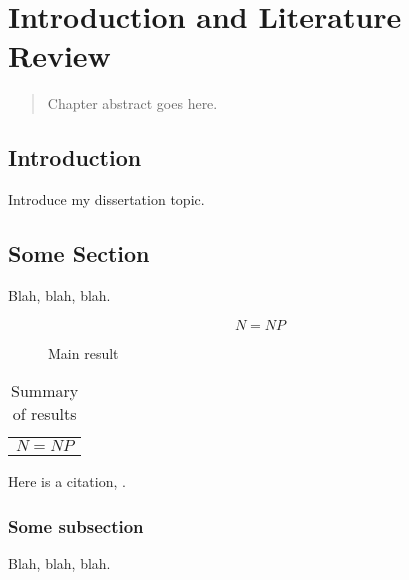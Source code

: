 \chapter{Introduction and Literature Review}

\begin{quote}
Chapter abstract goes here.
\end{quote}

\section{Introduction}

Introduce my dissertation topic.
\section{Some Section}

Blah, blah, blah.

\begin{figure}[t]\caption{Main result}
$$
N = NP
$$
\end{figure}

\begin{table}[h]\caption{Summary of results}
\begin{tabular}{c}
$N = NP$
\end{tabular}
\end{table}

Here is a citation, .

\subsection{Some subsection}

Blah, blah, blah.

